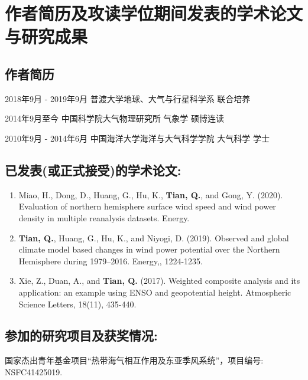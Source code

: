 \chapter{作者简历及攻读学位期间发表的学术论文与研究成果}


\section*{作者简历}

2018年9月 - 2019年9月 \quad 普渡大学地球、大气与行星科学系 \quad 联合培养

2014年9月至今 \quad 中国科学院大气物理研究所 \quad 气象学 \quad 硕博连读

2010年9月 - 2014年6月 \quad 中国海洋大学海洋与大气科学学院 \quad 大气科学 \quad 学士


\section*{已发表(或正式接受)的学术论文:}

{
\setlist[enumerate]{}%
\begin{enumerate}[nosep]
    \item Miao, H., Dong, D., Huang, G., Hu, K., \textbf{Tian, Q.}, and Gong, Y. (2020). Evaluation of northern hemisphere surface wind speed and wind power density in multiple reanalysis datasets. Energy.
    
    \item \textbf{Tian, Q.}, Huang, G., Hu, K., and Niyogi, D. (2019). Observed and global climate model based changes in wind power potential over the Northern Hemisphere during 1979–2016. Energy,, 1224-1235.
    
    \item Xie, Z., Duan, A., and \textbf{Tian, Q.} (2017). Weighted composite analysis and its application: an example using ENSO and geopotential height. Atmospheric Science Letters, 18(11), 435-440.
\end{enumerate}
}


\section*{参加的研究项目及获奖情况:}

国家杰出青年基金项目“热带海气相互作用及东亚季风系统”，项目编号: NSFC41425019.

